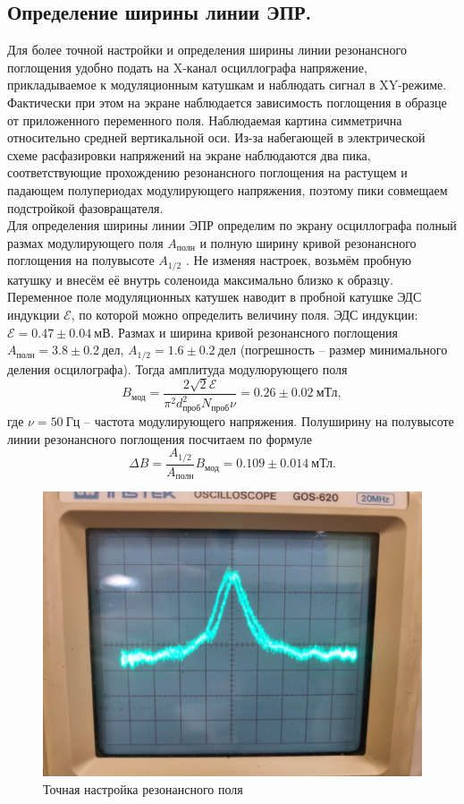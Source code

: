\documentclass[a4paper,12pt]{article}
\begin{document}
\subsection*{Определение ширины линии ЭПР.}
Для более точной настройки и определения ширины линии резонансного поглощения удобно подать на X-канал осциллографа напряжение, прикладываемое к модуляционным катушкам и наблюдать сигнал в XY-режиме. Фактически при этом на экране наблюдается зависимость поглощения в образце от приложенного переменного поля. Наблюдаемая картина симметрична относительно средней вертикальной оси. Из-за набегающей в электрической схеме расфазировки напряжений на экране наблюдаются два пика, соответствующие прохождению резонансного поглощения на растущем и падающем полупериодах модулирующего напряжения, поэтому пики совмещаем подстройкой фазовращателя.\\
Для определения ширины линии ЭПР определим по экрану осциллографа полный размах
модулирующего поля $A_{\text{полн}}$ и полную ширину кривой резонансного
поглощения на полувысоте $A_{\text{1/2}}$ . Не изменяя настроек, возьмём пробную катушку и внесём её внутрь соленоида максимально близко к образцу. Переменное поле модуляционных катушек наводит в пробной катушке ЭДС индукции $\mathcal{E}$, по которой можно определить величину поля. ЭДС индукции: $\mathcal{E} = 0.47\pm 0.04~\text{мВ}$. Размах и ширина кривой резонансного поглощения $A_{\text{полн}} = 3.8 \pm 0.2~\text{дел}$, $A_{\text{1/2}} = 1.6 \pm 0.2~\text{дел}$ (погрешность -- размер минимального деления осцилографа). Тогда амплитуда модулюрующего поля
\[B_{\text{мод}} = \dfrac{2\sqrt{2}\mathcal{E}}{\pi^2 d_{\text{проб}}^2 N_{\text{проб}}\nu} = 0.26 \pm 0.02~\text{мТл},\]
где $\nu = 50~\text{Гц}$ -- частота модулирующего напряжения. Полуширину на полувысоте линии резонансного поглощения посчитаем по формуле
\[\Delta B = \dfrac{A_{1/2}}{A_{\text{полн}}} B_{\text{мод}} = 0.109 \pm 0.014~\text{мТл}.\]
\begin{figure}[h]
    \includegraphics[scale=0.34]{hehe.jpg}
    \caption{Точная настройка резонансного поля}
    \centering
\end{figure} 
\end{document}
